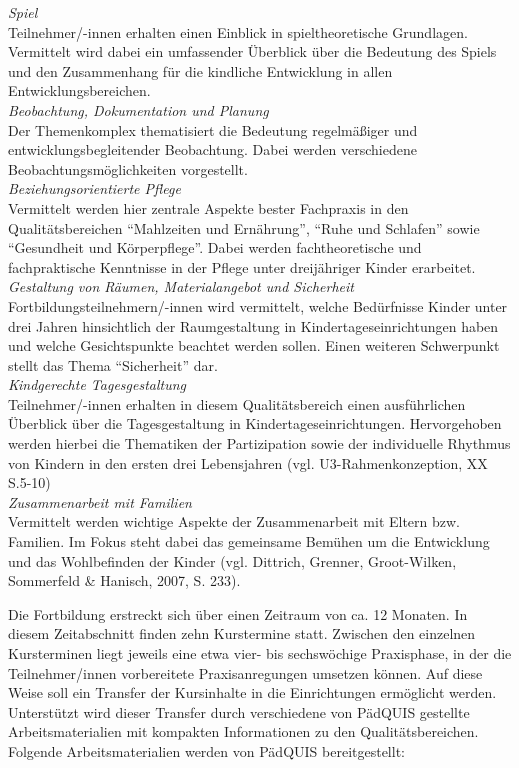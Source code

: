 \documentclass[12pt,a4paper]{article}
\begin{document}
\textit{Spiel}\\
Teilnehmer/-innen erhalten einen Einblick in spieltheoretische Grundlagen. Vermittelt wird dabei ein umfassender Überblick über die Bedeutung des Spiels und den Zusammenhang für die kindliche Entwicklung in allen Entwicklungsbereichen.\\

\textit{Beobachtung, Dokumentation und Planung}\\
Der Themenkomplex thematisiert die Bedeutung regelmäßiger und entwicklungsbegleitender Beobachtung. Dabei werden verschiedene Beo\-bach\-tungs\-möglich\-kei\-ten vorgestellt.\\

\textit{Beziehungsorientierte Pflege}\\
Vermittelt werden hier zentrale Aspekte bester Fachpraxis in den Qua\-li\-täts\-be\-rei\-chen "`Mahlzeiten und Ernährung"', "`Ruhe und Schlafen"' sowie "`Gesundheit und Körperpflege"'. Dabei werden fachtheoretische und fachpraktische Kenntnisse in der Pflege unter dreijähriger Kinder erarbeitet.\\

\textit{Gestaltung von Räumen, Materialangebot und Sicherheit}\\
Fortbildungsteilnehmern/-innen wird vermittelt, welche Bedürfnisse Kin\-der unter drei Jahren hinsichtlich der Raumgestaltung in Kindertageseinrichtungen haben und welche Gesichtspunkte beachtet werden sollen. Einen weiteren Schwerpunkt stellt das Thema "`Sicherheit"' dar.\\

\textit{Kindgerechte Tagesgestaltung}\\
Teilnehmer/-innen erhalten in diesem Qualitätsbereich einen ausführlichen Überblick über die Tagesgestaltung in Kindertageseinrichtungen. Hervorgehoben werden hierbei die Thematiken der Partizipation sowie der individuelle Rhythmus von Kindern in den ersten drei Lebensjahren (vgl. U3-Rahmenkonzeption, XX S.5-10)\\

\textit{Zusammenarbeit mit Familien}\\
Vermittelt werden wichtige Aspekte der Zusammenarbeit mit Eltern bzw. Familien. Im Fokus steht dabei das gemeinsame Bemühen um die Entwicklung und das Wohlbefinden der Kinder (vgl. Dittrich, Grenner, Groot-Wilken, Sommerfeld \& Hanisch, 2007, S. 233). 

Die Fortbildung erstreckt sich über einen Zeitraum von ca. 12 Monaten. In diesem Zeitabschnitt finden zehn Kurstermine statt. Zwischen den einzelnen Kursterminen liegt jeweils eine etwa vier- bis sechswöchige Praxisphase, in der die Teilnehmer/innen vorbereitete Praxisanregungen umsetzen können. Auf diese Weise soll ein Transfer der Kursinhalte in die Einrichtungen ermöglicht  werden. Unterstützt wird dieser Transfer durch verschiedene von PädQUIS gestellte Arbeitsmaterialien mit kompakten Informationen zu den Qualitätsbereichen.  
Folgende Arbeitsmaterialien werden von PädQUIS bereitgestellt:
\end{document}
